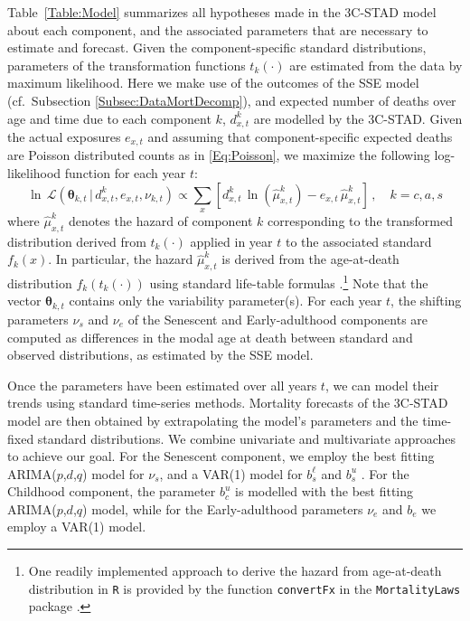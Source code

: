 \documentclass[11pt, a4paper]{article}
\begin{document}
Table~\ref{Table:Model} summarizes all hypotheses made in the 3C-STAD model about each component, and the associated parameters that are necessary to estimate and forecast. Given the component-specific standard distributions, parameters of the transformation functions $t_{k}(\cdot)$ are estimated from the data by maximum likelihood. Here we make use of the outcomes of the SSE model (cf.~Subsection \ref{Subsec:DataMortDecomp}), and expected number of deaths over age and time due to each component $k$, $d^{k}_{x,t}$ are modelled by the 3C-STAD. Given the actual exposures $e_{x,t}$ and assuming that component-specific expected deaths are Poisson distributed counts as in \eqref{Eq:Poisson}, we maximize the following log-likelihood function for each year $t$:
% 
\begin{equation}\label{Eq:PoiLogLike}
\ln \, \mathcal{L}\left(\bm{\theta}_{k,t}\,|\, d^{k}_{x,t} , e_{x,t} , \nu_{k,t} \right) \propto \sum_{x} \left[  d^{k}_{x,t} \,
\ln \left ( \hat{\mu}^{k}_{x,t}  \right ) - e_{x,t}
\, \hat{\mu}^{k}_{x,t}  \right]  \,, \quad k=c,a,s 
\end{equation}
%
where $\hat{\mu}^{k}_{x,t}$ denotes the hazard of component $k$ corresponding to the transformed distribution derived from $t_{k}(\cdot)$ applied in year $t$ to the associated standard $f_{k}(x)$. {\color{red}In particular, the hazard $\hat{\mu}^k_{x,t}$ is derived from the age-at-death distribution $f_{k}(t_k(\cdot))$ using standard life-table formulas \citep{preston2001demogr}.\footnote{{\color{red}One readily implemented approach to derive the hazard from age-at-death distribution in \texttt{R} is provided by the function \texttt{convertFx} in the \texttt{MortalityLaws} package  \citep{pascariu2018mortalitylaws}.}}} Note that the vector $\bm{\theta}_{k,t}$ contains only the {\color{red}variability} parameter(s). For each year $t$, the shifting parameters $\nu_{s}$ and $\nu_{e}$ of the Senescent and Early-adulthood components are computed as differences in the modal age at death between standard and observed distributions, as estimated by the SSE model. 

Once the parameters have been estimated over all years $t$, we can model their trends using standard time-series methods. Mortality forecasts of the 3C-STAD model are then obtained by extrapolating the model's parameters and the time-fixed standard distributions. We combine univariate and multivariate approaches to achieve our goal. For the Senescent component, we employ the best fitting ARIMA($p$,$d$,$q$) model for $\nu_{s}$, and a VAR(1) model for $b^{\ell}_{s}$ and $b^{u}_{s}$ \cite[as in][]{basellini2019stad}. For the Childhood component, the parameter $b_{c}^{u}$ is modelled with the best fitting ARIMA($p$,$d$,$q$) model, while for the Early-adulthood parameters $\nu_{e}$ and $b_{e}$ we employ a VAR(1) model.
\end{document}
